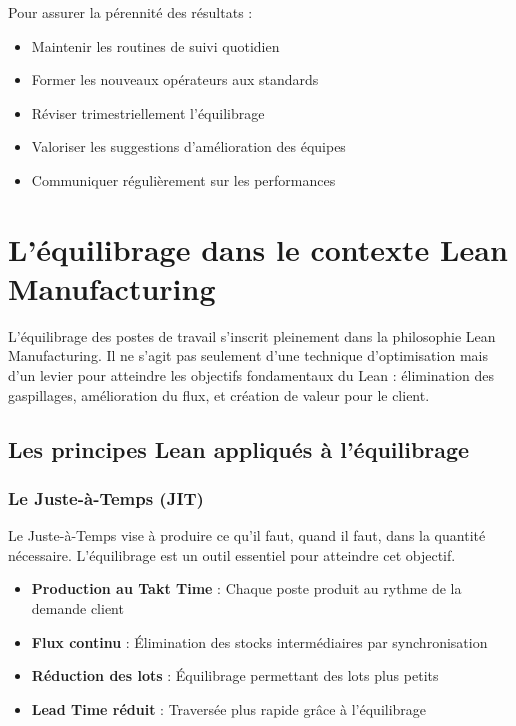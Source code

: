\documentclass[12pt,a4paper]{article}
\newenvironment{methodbox}[1]
  {\begin{tcolorbox}[colback=blue!5!white, colframe=methodcolor, title=#1]\small}
  {\end{tcolorbox}}
\newenvironment{conseil}
  {\begin{tcolorbox}[colback=green!5!white, colframe=green!50!black, title=\textbf{Conseil}]\small}
  {\end{tcolorbox}}
\begin{document}
\begin{conseil}
Pour assurer la pérennité des résultats :
\begin{itemize}
    \item Maintenir les routines de suivi quotidien
    \item Former les nouveaux opérateurs aux standards
    \item Réviser trimestriellement l'équilibrage
    \item Valoriser les suggestions d'amélioration des équipes
    \item Communiquer régulièrement sur les performances
\end{itemize}
\end{conseil}
\newpage

\section{L'équilibrage dans le contexte Lean Manufacturing}

L'équilibrage des postes de travail s'inscrit pleinement dans la philosophie Lean Manufacturing. Il ne s'agit pas seulement d'une technique d'optimisation mais d'un levier pour atteindre les objectifs fondamentaux du Lean : élimination des gaspillages, amélioration du flux, et création de valeur pour le client.

\subsection{Les principes Lean appliqués à l'équilibrage}

\subsubsection{Le Juste-à-Temps (JIT)}

Le Juste-à-Temps vise à produire ce qu'il faut, quand il faut, dans la quantité nécessaire. L'équilibrage est un outil essentiel pour atteindre cet objectif.

\begin{methodbox}{Application du JIT à l'équilibrage}
\begin{itemize}
    \item \textbf{Production au Takt Time} : Chaque poste produit au rythme de la demande client
    \item \textbf{Flux continu} : Élimination des stocks intermédiaires par synchronisation
    \item \textbf{Réduction des lots} : Équilibrage permettant des lots plus petits
    \item \textbf{Lead Time réduit} : Traversée plus rapide grâce à l'équilibrage
\end{itemize}
\end{methodbox}
\end{document}
